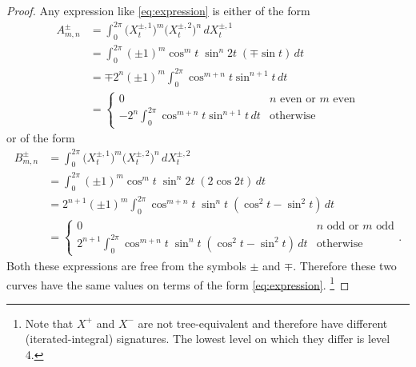 \begin{proof}
  Any expression like \eqref{eq:expression} is either of the form
  \begin{align*}
A_{m,n}^\pm&=\int_0^{2\pi}\big(X^{\pm,1}_t\big)^m\big(X^{\pm,2}_t\big)^n\,dX^{\pm,1}_t
\\&=\int_0^{2\pi}(\pm1)^m\cos^m t\;\sin^n 2t \;(\mp\sin t)\,dt
  \\&=\mp2^n(\pm1)^m\int_0^{2\pi}\cos^{m+n}t\sin^{n+1}t\,dt
\\&=\begin{cases}0&\text{$n$ even or $m$ even}\\-2^n\int_0^{2\pi}\cos^{m+n}t\sin^{n+1}t\,dt&\text{otherwise}\end{cases}
  \end{align*}
  or of the form
  \begin{align*}
  B_{m,n}^\pm&=\int_0^{2\pi}\big(X^{\pm,1}_t\big)^m\big(X^{\pm,2}_t\big)^n\,dX^{\pm,2}_t
\\&=\int_0^{2\pi}(\pm1)^m\cos^m t\;\sin^n 2t \;(2\cos 2t)\,dt
    \\&=2^{n+1}(\pm1)^m\int_0^{2\pi}\cos^{m+n}t\;\sin^{n}t\;(\cos^2t-\sin^2t)\,dt
  \\&=\begin{cases}0&\text{$n$ odd or $m$ odd}\\2^{n+1}\int_0^{2\pi}\cos^{m+n}t\;\sin^{n}t\;(\cos^2t-\sin^2t)\,dt&\text{otherwise}\end{cases}.
  \end{align*}
  Both these expressions are free from the symbols $\pm$ and $\mp$. Therefore these two curves have the same
  values on terms of the form \eqref{eq:expression}.
  \footnote{
  Note that $X^+$ and $X^-$ are not tree-equivalent and therefore have different (iterated-integral) signatures. The lowest level on which they differ is level 4.
  }%
\end{proof}

